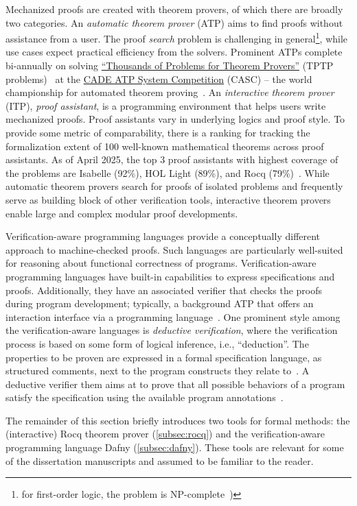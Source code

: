 Mechanized proofs are created with theorem provers, of which there are broadly two categories.
An \emph{automatic theorem prover} (ATP) aims to find proofs without assistance from a user.
The proof \emph{search} problem is challenging in general\footnote{\Eg for first-order logic, the problem is NP-complete~\cite{cook1971, levin1973})}, while use cases expect practical efficiency from the solvers.
Prominent ATPs complete bi-annually on solving \href{https://www.tptp.org}{\enquote{Thousands of Problems for Theorem Provers}} (TPTP problems)~\cite{sutcliffe2024} at the \href{https://tptp.org/CASC/}{CADE ATP System Competition} (CASC) --
the world championship for automated theorem proving~\cite{casc}.
An \emph{interactive theorem prover} (ITP), \aka \emph{proof assistant}, is a programming environment that helps users write mechanized proofs.
Proof assistants vary in underlying logics and proof style.
To provide some metric of comparability, there is a ranking for tracking the formalization extent of 100 well-known mathematical theorems across proof assistants.
As of April 2025, the top 3 proof assistants with highest coverage of the problems are Isabelle (92\%), HOL Light (89\%), and Rocq (79\%)~\cite{hundredtheorems}.
While automatic theorem provers search for proofs of isolated problems and frequently serve as building block of other verification tools,
interactive theorem provers enable large and complex modular proof developments.

Verification-aware programming languages provide a conceptually different approach to machine-checked proofs.
Such languages are particularly well-suited for reasoning about functional correctness of programs.
Verification-aware programming languages have built-in capabilities to express specifications and proofs.
Additionally, they have an associated verifier that checks the proofs during program development;
typically, a background ATP that offers an interaction interface via a programming language~\cite{leino2023}.
One prominent style among the verification-aware languages is \emph{deductive verification},
where the verification process is based on some form of logical inference, i.e., \enquote{deduction}.
The properties to be proven are expressed in a formal specification language, as structured comments, next to the program constructs they relate to~\cite{hahnle2019}.
A deductive verifier them aims at to prove that all possible behaviors of a program satisfy the specification using the available program annotations~\cite{cassez2022}.

The remainder of this section briefly introduces two tools for formal methods:
the (interactive) Rocq theorem prover (\autoref{subsec:rocq}) and the verification-aware programming language Dafny (\autoref{subsec:dafny}).
These tools are relevant for some of the dissertation manuscripts and assumed to be familiar to the reader.

